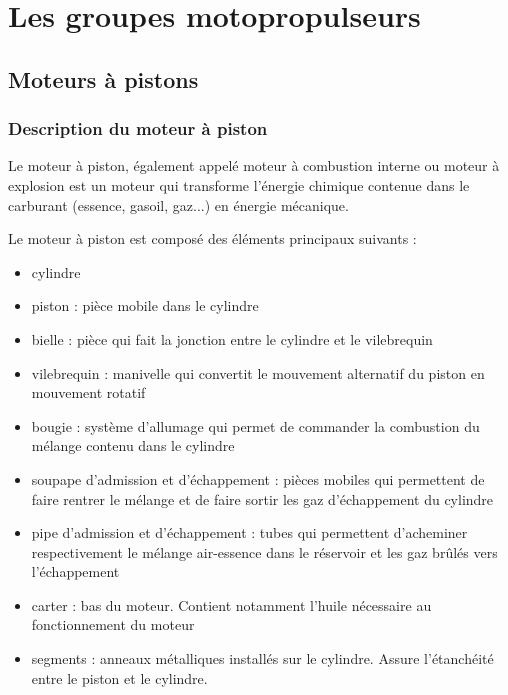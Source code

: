 

\section{Les groupes motopropulseurs}

	\subsection{Moteurs à pistons}
		\subsubsection{Description du moteur à piston}
		Le moteur à piston, également appelé moteur à combustion interne ou moteur à explosion est un moteur qui transforme l'énergie chimique contenue dans le carburant (essence, gasoil, gaz...) en énergie mécanique.
		\begin{figure}[H]
  		\centering
    		
		\end{figure}
		
		Le moteur à piston est composé des éléments principaux suivants :
		\begin{itemize}
			\item cylindre
			\item piston : pièce mobile dans le cylindre
			\item bielle : pièce qui fait la jonction entre le cylindre et le vilebrequin
			\item vilebrequin : manivelle qui convertit le mouvement alternatif du piston en mouvement rotatif
			\item bougie : système d'allumage qui permet de commander la combustion du mélange contenu dans le cylindre
			\item soupape d'admission et d'échappement : pièces mobiles qui permettent de faire rentrer le mélange et de faire sortir les gaz d'échappement du cylindre 
			\item pipe d'admission et d'échappement : tubes qui permettent d'acheminer respectivement le mélange air-essence dans le réservoir et les gaz brûlés vers l'échappement
			\item carter : bas du moteur. Contient notamment l'huile nécessaire au fonctionnement du moteur
			\item segments : anneaux métalliques installés sur le cylindre. Assure l'étanchéité entre le piston et le cylindre.
		\end{itemize}
	
